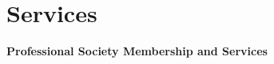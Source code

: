 \documentclass[paper=a4,fontsize=11pt]{scrartcl}
\begin{document}

%
%
%












\section*{Services}

\textbf{Professional Society Membership and Services} 
\end{document}
